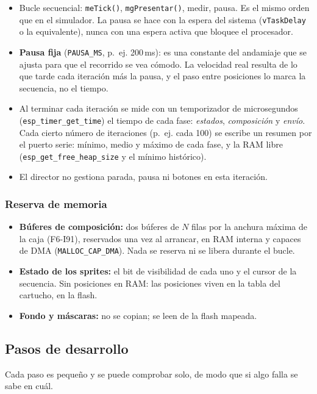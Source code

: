 \begin{itemize}
	\item Bucle secuencial: \texttt{meTick()}, \texttt{mgPresentar()}, medir, pausa. Es el mismo orden que en el simulador. La pausa se hace con la espera del sistema (\texttt{vTaskDelay} o la equivalente), nunca con una espera activa que bloquee el procesador.
	\item \textbf{Pausa fija} (\texttt{PAUSA\_MS}, p.~ej. 200\,ms): es una constante del andamiaje que se ajusta para que el recorrido se vea cómodo. La velocidad real resulta de lo que tarde cada iteración más la pausa, y el paso entre posiciones lo marca la secuencia, no el tiempo.
	\item Al terminar cada iteración se mide con un temporizador de microsegundos (\texttt{esp\_timer\_get\_time}) el tiempo de cada fase: \emph{estados}, \emph{composición} y \emph{envío}. Cada cierto número de iteraciones (p.~ej. cada 100) se escribe un resumen por el puerto serie: mínimo, medio y máximo de cada fase, y la RAM libre (\texttt{esp\_get\_free\_heap\_size} y el mínimo histórico).
	\item El director no gestiona parada, pausa ni botones en esta iteración.
\end{itemize}

\subsubsection{Reserva de memoria}

\begin{itemize}
	\item \textbf{Búferes de composición:} dos búferes de $N$ filas por la anchura máxima de la caja (F6-I91), reservados una vez al arrancar, en RAM interna y capaces de DMA (\texttt{MALLOC\_CAP\_DMA}). Nada se reserva ni se libera durante el bucle.
	\item \textbf{Estado de los sprites:} el bit de visibilidad de cada uno y el cursor de la secuencia. Sin posiciones en RAM: las posiciones viven en la tabla del cartucho, en la flash.
	\item \textbf{Fondo y máscaras:} no se copian; se leen de la flash mapeada.
\end{itemize}

\subsection{Pasos de desarrollo}
\label{sec:F6I92Pasos}

Cada paso es pequeño y se puede comprobar solo, de modo que si algo falla se sabe en cuál.

